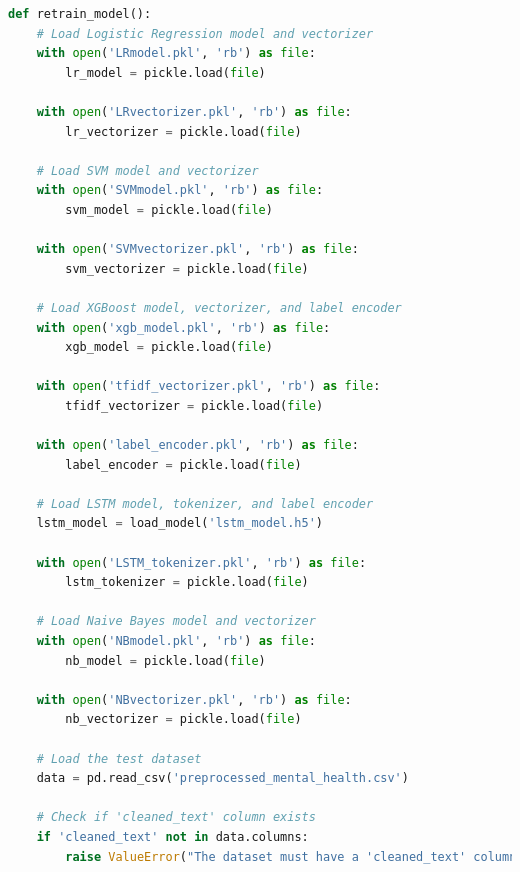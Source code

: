 \begin{tcolorbox}[colback=gray!5!white, colframe=gray!80!black, boxrule=0.5pt, title=Retraining the Ensemble Model]
    \begin{lstlisting}[language=Python]
def retrain_model():
    # Load Logistic Regression model and vectorizer
    with open('LRmodel.pkl', 'rb') as file:
        lr_model = pickle.load(file)

    with open('LRvectorizer.pkl', 'rb') as file:
        lr_vectorizer = pickle.load(file)

    # Load SVM model and vectorizer
    with open('SVMmodel.pkl', 'rb') as file:
        svm_model = pickle.load(file)

    with open('SVMvectorizer.pkl', 'rb') as file:
        svm_vectorizer = pickle.load(file)

    # Load XGBoost model, vectorizer, and label encoder
    with open('xgb_model.pkl', 'rb') as file:
        xgb_model = pickle.load(file)

    with open('tfidf_vectorizer.pkl', 'rb') as file:
        tfidf_vectorizer = pickle.load(file)

    with open('label_encoder.pkl', 'rb') as file:
        label_encoder = pickle.load(file)

    # Load LSTM model, tokenizer, and label encoder
    lstm_model = load_model('lstm_model.h5')

    with open('LSTM_tokenizer.pkl', 'rb') as file:
        lstm_tokenizer = pickle.load(file)

    # Load Naive Bayes model and vectorizer
    with open('NBmodel.pkl', 'rb') as file:
        nb_model = pickle.load(file)

    with open('NBvectorizer.pkl', 'rb') as file:
        nb_vectorizer = pickle.load(file)

    # Load the test dataset
    data = pd.read_csv('preprocessed_mental_health.csv')

    # Check if 'cleaned_text' column exists
    if 'cleaned_text' not in data.columns:
        raise ValueError("The dataset must have a 'cleaned_text' column.")
    \end{lstlisting}
\end{tcolorbox}
